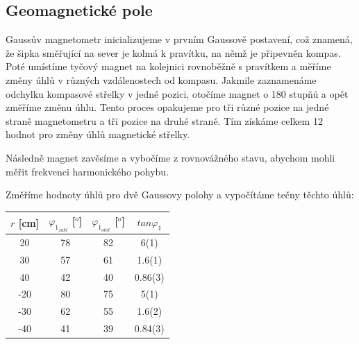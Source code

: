 \documentclass[a4paper,11pt]{article}
\begin{document}
\begin{minipage}[t]{0.5\textwidth}
        \subsection{Geomagnetické pole}
            Gaussův magnetometr inicializujeme v prvním Gaussově postavení, což znamená, že šipka směřující na sever je kolmá k pravítku, na němž je připevněn kompas. Poté umístíme tyčový magnet na kolejnici rovnoběžně s pravítkem a měříme změny úhlů v různých vzdálenostech od kompasu. Jakmile zaznamenáme odchylku kompasové střelky v jedné pozici, otočíme magnet o 180 stupňů a opět změříme změnu úhlu. Tento proces opakujeme pro tři různé pozice na jedné straně magnetometru a tři pozice na druhé straně. Tím získáme celkem 12 hodnot pro změny úhlů magnetické střelky.
            \par Následně magnet zavěsíme a vybočíme z rovnovážného stavu, abychom mohli měřit frekvenci harmonického pohybu.
            \par Změříme hodnoty úhlů pro dvě Gaussovy polohy a vypočítáme tečny těchto úhlů:
            \vspace{10pt}
            \par \centering
            \begin{tabular}{|c|c|c|c|}
                    \hline
                    $r$ [cm] & $\varphi_1_{zakl}$ [$^o$] & $\varphi_1_{otoč}$ [$^o$] & $tan\varphi_1$ \\
                    \hline
                    20 & 78 & 82 & 6(1) \\
                    \hline
                    30 & 57 & 61 & 1.6(1) \\
                    \hline
                    40 & 42 & 40 & 0.86(3) \\
                    \hline
                    -20 & 80 & 75 & 5(1) \\
                    \hline
                    -30 & 62 & 55 & 1.6(2) \\
                    \hline
                    -40 & 41 & 39 & 0.84(3) \\
                    \hline
                \end{tabular}
                \captionsetup{justification=centering, font=footnotesize}
                \vspace{20pt}
                \raggedright
    \end{minipage}
    \hspace{10pt}  
\end{document}
